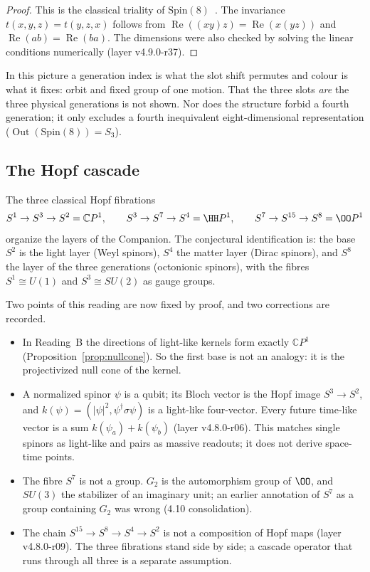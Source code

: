 \begin{proof}
This is the classical triality of \(\mathrm{Spin}(8)\)~\cite{baez}.  The invariance \(t(x,y,z)=t(y,z,x)\) follows from
\(\operatorname{Re}((xy)z)=\operatorname{Re}(x(yz))\) and \(\operatorname{Re}(ab)=\operatorname{Re}(ba)\).  The dimensions were also checked by
solving the linear conditions numerically (layer v4.9.0-r37).
\end{proof}

In this picture a generation index is what the slot shift permutes and colour is what it fixes: orbit and fixed group of one
motion.  That the three slots \emph{are} the three physical generations is not shown.  Nor does the structure forbid a fourth
generation; it only excludes a fourth inequivalent eight-dimensional representation (\(\operatorname{Out}(\mathrm{Spin}(8))=S_3\)).

\subsection{The Hopf cascade}

The three classical Hopf fibrations~\cite{hopf1931,hopf1935}
\[
S^1\to S^3\to S^2=\mathbb CP^1,\qquad
S^3\to S^7\to S^4=\HH P^1,\qquad
S^7\to S^{15}\to S^8=\OO P^1
\]
organize the layers of the Companion.  The conjectural identification is: the base \(S^2\) is the light layer (Weyl spinors), \(S^4\)
the matter layer (Dirac spinors), and \(S^8\) the layer of the three generations (octonionic spinors), with the fibres
\(S^1\cong U(1)\) and \(S^3\cong SU(2)\) as gauge groups.

Two points of this reading are now fixed by proof, and two corrections are recorded.
\begin{itemize}
\item In Reading~B the directions of light-like kernels form exactly \(\mathbb CP^1\) (Proposition~\ref{prop:nullcone}).  So the
first base is not an analogy: it is the projectivized null cone of the kernel.
\item A normalized spinor \(\psi\) is a qubit; its Bloch vector is the Hopf image \(S^3\to S^2\), and
\(k(\psi)=(|\psi|^2,\psi^\dagger\sigma\psi)\) is a light-like four-vector.  Every future time-like vector is a sum
\(k(\psi_a)+k(\psi_b)\) (layer v4.8.0-r06).  This matches single spinors as light-like and pairs as massive readouts; it does not
derive space-time points.
\item The fibre \(S^7\) is not a group.  \(G_2\) is the automorphism group of \(\OO\), and \(SU(3)\) the stabilizer of an imaginary
unit; an earlier annotation of \(S^7\) as a group containing \(G_2\) was wrong (4.10 consolidation).
\item The chain \(S^{15}\to S^8\to S^4\to S^2\) is not a composition of Hopf maps (layer v4.8.0-r09).  The three fibrations stand
side by side; a cascade operator that runs through all three is a separate assumption.
\end{itemize}

